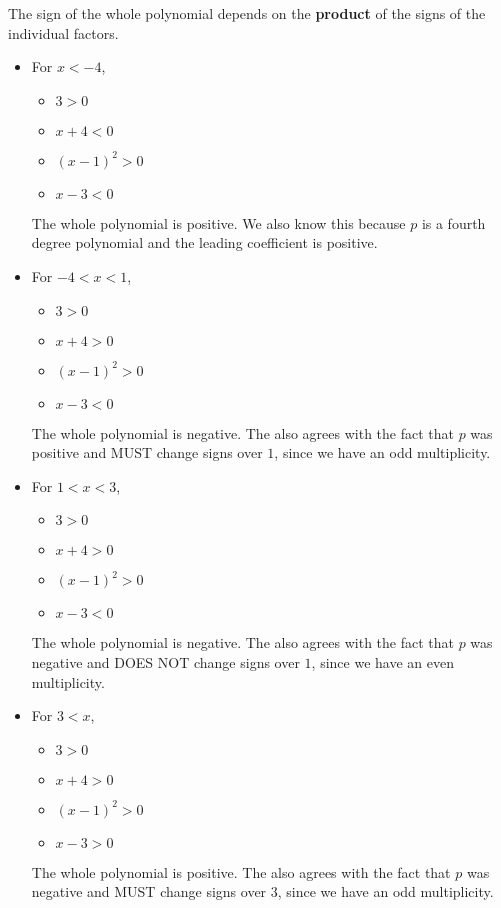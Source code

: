 \documentclass{ximera}
\begin{document}
\begin{example}
The sign of the whole polynomial depends on the \textbf{\textcolor{purple!85!blue}{product}} of the signs of the individual factors.



\begin{itemize}
\item For $x < -4$, 
\begin{itemize}
  \item $3 > 0$
  \item $x+4 < 0$
  \item $(x-1)^2 > 0$
  \item $x-3 < 0$ 
\end{itemize}
The whole polynomial is positive. We also know this because $p$ is a fourth degree polynomial and the leading coefficient is positive.


\item For $-4 < x < 1$, 
\begin{itemize}
  \item $3 > 0$
  \item $x+4 > 0$
  \item $(x-1)^2 > 0$
  \item $x-3 < 0$ 
\end{itemize}
The whole polynomial is negative. The also agrees with the fact that $p$ was positive and MUST change signs over $1$, since we have an odd multiplicity.


\item For $1 < x < 3$, 
\begin{itemize}
  \item $3 > 0$
  \item $x+4 > 0$
  \item $(x-1)^2 > 0$
  \item $x-3 < 0$ 
\end{itemize}
The whole polynomial is negative. The also agrees with the fact that $p$ was negative and DOES NOT change signs over $1$, since we have an even multiplicity.


\item For $3 < x$, 
\begin{itemize}
  \item $3 > 0$
  \item $x+4 > 0$
  \item $(x-1)^2 > 0$
  \item $x-3 > 0$ 
\end{itemize}
The whole polynomial is positive. The also agrees with the fact that $p$ was negative and MUST change signs over $3$, since we have an odd multiplicity.
\end{itemize}











\end{example}
\end{document}
